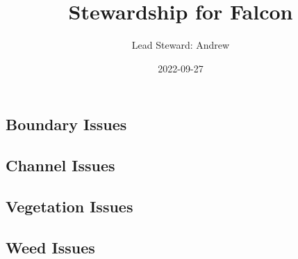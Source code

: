 \documentclass[
  landscape]{article}
\title{Stewardship for Falcon}
\author{Lead Steward: Andrew}
\date{2022-09-27}
\begin{document}
\maketitle

\hypertarget{boundary-issues}{%
\subsection{Boundary Issues}\label{boundary-issues}}

\textbar\textbar{} \textbar\textbar{} \textbar\textbar{}
\textbar\textbar{}

\hypertarget{channel-issues}{%
\subsection{Channel Issues}\label{channel-issues}}

\textbar\textbar{} \textbar\textbar{} \textbar\textbar{}
\textbar\textbar{}

\newpage

\hypertarget{vegetation-issues}{%
\subsection{Vegetation Issues}\label{vegetation-issues}}

\textbar\textbar{} \textbar\textbar{} \textbar\textbar{}
\textbar\textbar{}

\newpage

\hypertarget{weed-issues}{%
\subsection{Weed Issues}\label{weed-issues}}
\end{document}
